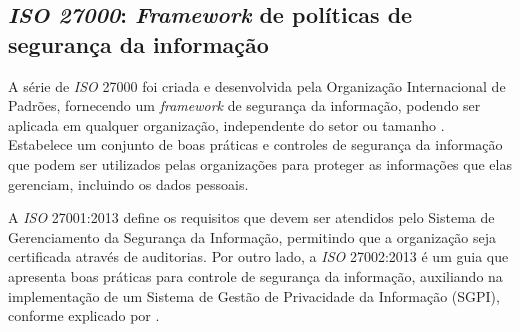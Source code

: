 \documentclass[
	12pt,				%
	openright,			%
	oneside,			%
	a4paper,			%
	english,			%
	french,				%
	spanish,			%
	brazil,				%
	]{abntex2}
\begin{document}
\subsection{\textit{ISO 27000}: \textit{Framework} de políticas de segurança da informação}

A série de \textit{ISO} 27000 foi criada e desenvolvida pela Organização Internacional de Padrões, fornecendo um \textit{framework} de segurança da informação, podendo ser aplicada em qualquer organização, independente do setor ou tamanho \cite{Pohlmann2019}. Estabelece um conjunto de boas práticas e controles de segurança da informação que podem ser utilizados pelas organizações para proteger as informações que elas gerenciam, incluindo os dados pessoais.

A \textit{ISO} 27001:2013 define os requisitos que devem ser atendidos pelo Sistema de Gerenciamento da Segurança da Informação, permitindo que a organização seja certificada através de auditorias. Por outro lado, a \textit{ISO} 27002:2013 é um guia que apresenta boas práticas para controle de segurança da informação, auxiliando na implementação de um Sistema de Gestão de Privacidade da Informação (SGPI), conforme explicado por \cite{Jimene2020}. 

\end{document}
